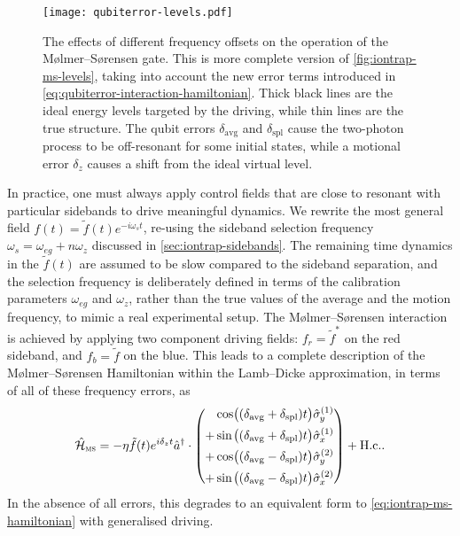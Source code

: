 \begin{figure}%
    \texttt{[image: qubiterror-levels.pdf]}%
    \caption[Energy-level diagram of two co-trapped ions]{\label{fig:qubiterror-levels}%
        The effects of different frequency offsets on the operation of the M\o lmer--S\o rensen gate.
        This is more complete version of \cref{fig:iontrap-ms-levels}, taking into account the new error terms introduced in \cref{eq:qubiterror-interaction-hamiltonian}.
        Thick black lines are the ideal energy levels targeted by the driving, while thin lines are the true structure.
        The qubit errors $\delta_{\text{avg}}$ and $\delta_{\text{spl}}$ cause the two-photon process to be off-resonant for some initial states, while a motional error $\delta_z$ causes a shift from the ideal virtual level.
}%
\end{figure}

In practice, one must always apply control fields that are close to resonant with particular sidebands to drive meaningful dynamics.
We rewrite the most general field $f(t) = \tilde f(t) e^{-i\omega_s t}$, re-using the sideband selection frequency $\omega_s = \omega_{eg} + n\omega_z$ discussed in \cref{sec:iontrap-sidebands}.
The remaining time dynamics in the $\tilde f(t)$ are assumed to be slow compared to the sideband separation, and the selection frequency is deliberately defined in terms of the calibration parameters $\omega_{eg}$ and $\omega_z$, rather than the true values of the average and the motion frequency, to mimic a real experimental setup.
The M\o lmer--S\o rensen interaction is achieved by applying two component driving fields: $f_r = \tilde f^*$ on the red sideband, and $f_b = \tilde f$ on the blue.
This leads to a complete description of the M\o lmer--S\o rensen Hamiltonian within the Lamb--Dicke approximation, in terms of all of these frequency errors, as
\begin{equation}\label{eq:qubiterror-ms-hamiltonian}
\H_{\ms} = -\eta \tilde f(t) e^{i\delta_z t}\a^\dagger\cdot\mathopen{}\left(
    \begin{alignedat}2
     &\cos&\bigl((\delta_{\text{avg}}+\delta_{\text{spl}})t\bigr)&\sy^{(1)}\\
    +&\sin&\bigl((\delta_{\text{avg}}+\delta_{\text{spl}})t\bigr)&\sx^{(1)}\\
    +&\cos&\bigl((\delta_{\text{avg}}-\delta_{\text{spl}})t\bigr)&\sy^{(2)}\\
    +&\sin&\bigl((\delta_{\text{avg}}-\delta_{\text{spl}})t\bigr)&\sx^{(2)}\\
    \end{alignedat}\mathclose{}\right) + \text{H.c.}.
\end{equation}
In the absence of all errors, this degrades to an equivalent form to \cref{eq:iontrap-ms-hamiltonian} with generalised driving.

